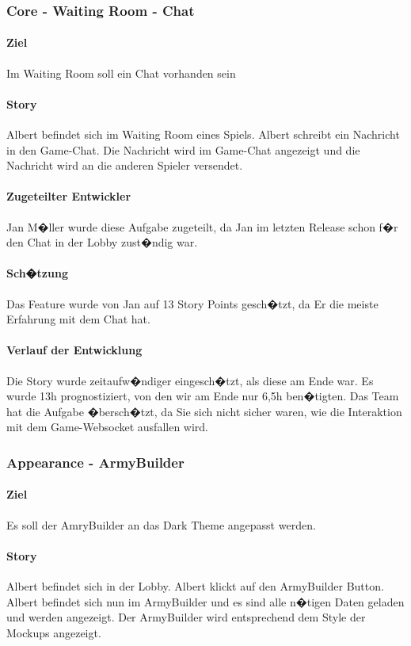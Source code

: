 \documentclass[12pt, titlepage]{scrartcl}
\begin{document}
		\subsubsection{Core - Waiting Room - Chat}
		\paragraph{Ziel} Im Waiting Room soll ein Chat vorhanden sein
		\paragraph{Story} Albert befindet sich im Waiting Room eines Spiels. Albert schreibt ein Nachricht in den Game-Chat. Die Nachricht wird im Game-Chat angezeigt und die Nachricht wird an die anderen Spieler versendet.
		\paragraph{Zugeteilter Entwickler} Jan M�ller wurde diese Aufgabe zugeteilt, da Jan im letzten Release schon f�r den Chat in der Lobby zust�ndig war.
		\paragraph{Sch�tzung}
		Das Feature wurde von Jan auf 13 Story Points gesch�tzt, da Er die meiste Erfahrung mit dem Chat hat.
		\paragraph{Verlauf der Entwicklung} 
		Die Story wurde zeitaufw�ndiger eingesch�tzt, als diese am Ende war. Es wurde 13h prognostiziert, von den wir am Ende nur 6,5h ben�tigten. Das Team hat die Aufgabe �bersch�tzt, da Sie sich nicht sicher waren, wie die Interaktion mit dem Game-Websocket ausfallen wird.
		
		\subsubsection{Appearance - ArmyBuilder}
		\paragraph{Ziel} Es soll der AmryBuilder an das Dark Theme angepasst werden.
		\paragraph{Story} Albert befindet sich in der Lobby. Albert klickt auf den ArmyBuilder Button. Albert befindet sich nun im ArmyBuilder und es sind alle n�tigen Daten geladen und werden angezeigt. Der ArmyBuilder wird entsprechend dem Style der Mockups angezeigt.
\end{document}
